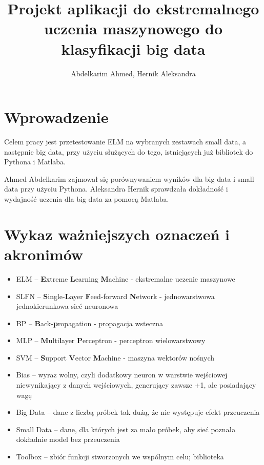 \documentclass{article}
\title{Projekt aplikacji do ekstremalnego uczenia maszynowego do klasyfikacji big data}
\author{Abdelkarim Ahmed, Hernik Aleksandra}
\date{}
\begin{document}
\clearpage
\vspace*{\fill}
\begin{center}
\begin{minipage}{.9\textwidth}
\maketitle
\end{minipage}
\end{center}
\vfill %
\clearpage

\tableofcontents
\clearpage

\section*{Wprowadzenie}
Celem pracy jest przetestowanie ELM na wybranych zestawach small data, a następnie big data, przy użyciu służących do tego, istniejących już bibliotek do Pythona i Matlaba.

Ahmed Abdelkarim zajmował się porównywaniem wyników dla big data i small data przy użyciu Pythona.
Aleksandra Hernik sprawdzała dokładność i wydajność uczenia dla big data za pomocą Matlaba.
\clearpage
\section*{Wykaz ważniejszych oznaczeń i akronimów}
\begin{itemize}[label={},leftmargin=*]
\item ELM -- \textbf{E}xtreme \textbf{L}earning \textbf{M}achine - ekstremalne uczenie maszynowe
\item SLFN -- \textbf{S}ingle-\textbf{L}ayer \textbf{F}eed-forward \textbf{N}etwork - jednowarstwowa jednokierunkowa sieć neuronowa
\item BP -- \textbf{B}ack-\textbf{p}ropagation - propagacja wsteczna
\item MLP -- \textbf{M}ulti\textbf{l}ayer \textbf{P}erceptron - perceptron wielowarstwowy
\item SVM -- \textbf{S}upport \textbf{V}ector \textbf{M}achine - maszyna wektorów nośnych
\item Bias -- wyraz wolny, czyli dodatkowy neuron w warstwie wejściowej niewynikający z danych wejściowych, generujący zawsze +1, ale posiadający wagę
\item Big Data -- dane z liczbą próbek tak dużą, że nie występuje efekt przeuczenia
\item Small Data -- dane, dla których jest za mało próbek, aby sieć poznała dokładnie model bez przeuczenia
\item Toolbox -- zbiór funkcji stworzonych we wspólnym celu; biblioteka
\end{itemize}
\clearpage
\end{document}
